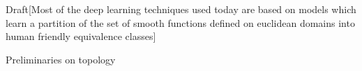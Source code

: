 \documentclass[12pt,a4paper]{article}
\begin{document}
    \begin{titlepage}
        
    \end{titlepage}
        
        \newpage
        
        \newpage
    \tableofcontents
    \newpage
    Draft[Most of the deep learning techniques used today are based on models 
    which learn a partition of the set of smooth functions defined on euclidean 
    domains into human friendly equivalence classes]
    \begin{section}{Preliminaries on topology}
        
    \end{section}
\end{document}

